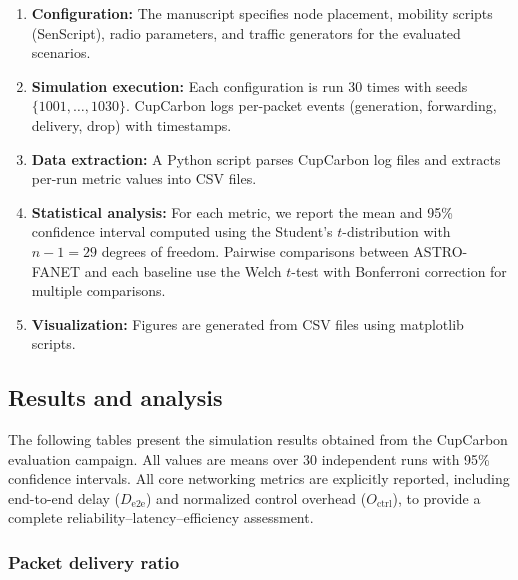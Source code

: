 \documentclass[5p,times]{elsarticle}
\begin{document}
\begin{enumerate}
\item \textbf{Configuration:} The manuscript specifies node placement, mobility scripts (SenScript), radio parameters, and traffic generators for the evaluated scenarios.
\item \textbf{Simulation execution:} Each configuration is run 30 times with seeds $\{1001, \dots, 1030\}$. CupCarbon logs per-packet events (generation, forwarding, delivery, drop) with timestamps.
\item \textbf{Data extraction:} A Python script parses CupCarbon log files and extracts per-run metric values into CSV files.
\item \textbf{Statistical analysis:} For each metric, we report the mean and 95\% confidence interval computed using the Student's $t$-distribution with $n-1 = 29$ degrees of freedom. Pairwise comparisons between ASTRO-FANET and each baseline use the Welch $t$-test with Bonferroni correction for multiple comparisons.
\item \textbf{Visualization:} Figures are generated from CSV files using matplotlib scripts.
\end{enumerate}

\subsection{Results and analysis}
\label{subsec:results}

The following tables present the simulation results obtained from the CupCarbon evaluation campaign. All values are means over 30 independent runs with 95\% confidence intervals.
All core networking metrics are explicitly reported, including end-to-end delay ($D_{\mathrm{e2e}}$) and normalized control overhead ($O_{\mathrm{ctrl}}$), to provide a complete reliability--latency--efficiency assessment.

\subsubsection{Packet delivery ratio}
\end{document}
